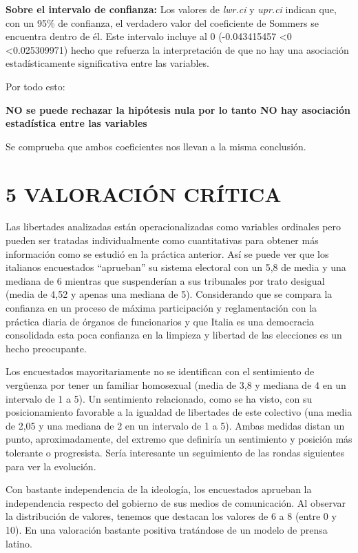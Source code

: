 \documentclass[
  12 pt,
  a4paper,
]{article}
\begin{document}
\textbf{Sobre el intervalo de confianza:} Los valores de \emph{lwr.ci} y
\emph{upr.ci} indican que, con un 95\% de confianza, el verdadero valor
del coeficiente de Sommers se encuentra dentro de él. Este intervalo
incluye al 0 (-0.043415457 \textless0 \textless0.025309971) hecho que
refuerza la interpretación de que no hay una asociación estadísticamente
significativa entre las variables.

Por todo esto:

\textbf{NO se puede rechazar la hipótesis nula por lo tanto NO hay
asociación estadística entre las variables}

Se comprueba que ambos coeficientes nos llevan a la misma conclusión.

\newpage

\section{5 VALORACIÓN CRÍTICA}\label{valoraciuxf3n-cruxedtica}

Las libertades analizadas están operacionalizadas como variables
ordinales pero pueden ser tratadas individualmente como cuantitativas
para obtener más información como se estudió en la práctica anterior.
Así se puede ver que los italianos encuestados ``aprueban'' su sistema
electoral con un 5,8 de media y una mediana de 6 mientras que
suspenderían a sus tribunales por trato desigual (media de 4,52 y apenas
una mediana de 5). Considerando que se compara la confianza en un
proceso de máxima participación y reglamentación con la práctica diaria
de órganos de funcionarios y que Italia es una democracia consolidada
esta poca confianza en la limpieza y libertad de las elecciones es un
hecho preocupante.

Los encuestados mayoritariamente no se identifican con el sentimiento de
vergüenza por tener un familiar homosexual (media de 3,8 y mediana de 4
en un intervalo de 1 a 5). Un sentimiento relacionado, como se ha visto,
con su posicionamiento favorable a la igualdad de libertades de este
colectivo (una media de 2,05 y una mediana de 2 en un intervalo de 1 a
5). Ambas medidas distan un punto, aproximadamente, del extremo que
definiría un sentimiento y posición más tolerante o progresista. Sería
interesante un seguimiento de las rondas siguientes para ver la
evolución.

Con bastante independencia de la ideología, los encuestados aprueban la
independencia respecto del gobierno de sus medios de comunicación. Al
observar la distribución de valores, tenemos que destacan los valores de
6 a 8 (entre 0 y 10). En una valoración bastante positiva tratándose de
un modelo de prensa latino.
\end{document}
